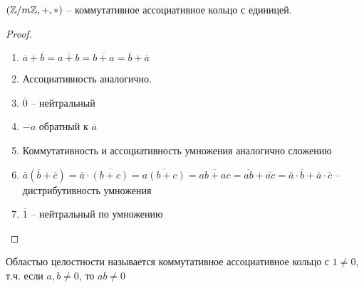 \documentclass[main]{subfiles}
\begin{document}
\begin{theorem}
    $(\mathbb{Z}/m\mathbb{Z},+, *)$ -- коммутативное ассоциативное кольцо с единицей.
\end{theorem}
\begin{proof}
    \begin{enumerate}
        \item $\overline{a} + \overline{b} = \overline{a+b} = \overline{b+a} = \overline{b} + \overline{a}$
        \item Ассоциативность аналогично.
        \item $\overline{0}$ -- нейтральный
        \item $\overline{-a}$ обратный к $\overline{a}$
        \item Коммутативность и ассоциативность умножения аналогично сложению
        \item $\overline{a}(\overline{b} + \overline{c}) =
                  \overline{a}\cdot \overline{(b+c)} = \overline{a(b+c)} =
                  \overline{ab+ac} = \overline{ab} + \overline{ac} =
                  \overline{a} \cdot \overline{b} + \overline{a} \cdot \overline{c}$
              -- дистрибутивность умножения
        \item $\overline{1}$ -- нейтральный по умножению
    \end{enumerate}
\end{proof}

\begin{definition}
    Областью целостности называется коммутативное ассоциативное кольцо с $1\neq 0$,
    т.ч. если $a, b \neq 0$, то $ab \neq 0$
\end{definition}
\end{document}
